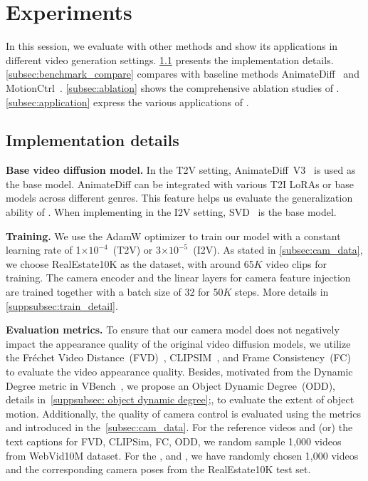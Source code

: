 \section{Experiments}\label{sec:experiment}
In this session, we evaluate \method with other methods and show its applications in different video generation settings.
%
\cref{subsec:implementation} presents the implementation details. \cref{subsec:benchmark_compare} compares \method with baseline methods AnimateDiff~\citep{animatediff} and MotionCtrl~\citep{motionctrl}. \cref{subsec:ablation} shows the comprehensive ablation studies of \method. \cref{subsec:application} express the various applications of \method.

\subsection{Implementation details} \label{subsec:implementation}
\noindent \textbf{Base video diffusion model.}
In the T2V setting, AnimateDiff~V3~\citep{animatediff} is used as the base model. 
% 
AnimateDiff can be integrated with various T2I LoRAs or base models across different genres. 
%
This feature helps us evaluate the generalization ability of \method.
%
When implementing \method in the I2V setting, SVD~\citep{svd} is the base model.

\noindent \textbf{Training.} 
We use the AdamW optimizer to train our model with a constant learning rate of 1$\times 10^{-4}$~(T2V) or 3$\times 10^{-5}$~(I2V).
 As stated in \cref{subsec:cam_data}, we choose RealEstate10K as the dataset, with around 65$K$ video clips for training. The camera encoder and the linear layers for camera feature injection are trained together with a batch size of 32 for 50$K$ steps. More details in \cref{suppsubsec:train_detail}.
 
 \noindent \textbf{Evaluation metrics.} 
 To ensure that our camera model does not negatively impact the appearance quality of the original video diffusion models, we utilize the Fréchet Video Distance~(FVD)~\citep{unterthiner2018towards, unterthiner2019fvd}, CLIPSIM~\citep{radford2021learning}, and Frame Consistency~(FC)~\citep{huang2023vbench} to evaluate the video appearance quality. 
Besides, motivated from the Dynamic Degree metric in VBench~\citep{huang2023vbench}, we propose an Object Dynamic Degree~(ODD), details in~\cref{suppsubsec: object dynamic degree};, to evaluate the extent of object motion.
 Additionally, the quality of camera control is evaluated using the metrics \rote and \te introduced in the~\cref{subsec:cam_data}.
For the reference videos and (or) the text captions for FVD, CLIPSim, FC, ODD, we random sample 1,000 videos from WebVid10M dataset.
%
For the \rote, and \te, we have randomly chosen 1,000 videos and the corresponding camera poses from the RealEstate10K test set.
 
